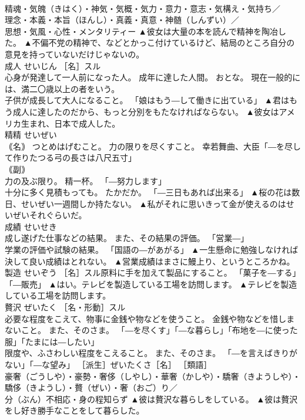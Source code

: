 \documentclass[8pt]{extreport}
\begin{document}
\begin{CJK}{UTF8}{min}
\\	精魂・気魄（きはく）・神気・気概・気力・意力・意志・気構え・気持ち／
\\	理念・本義・本旨（ほんし）・真義・真意・神髄（しんずい）／
\\	思想・気風・心性・メンタリティー	▲彼女は大量の本を読んで精神を陶冶した。 ▲不偏不党の精神で、などとかっこ付けているけど、結局のところ自分の意見を持っていないだけじゃないの。
\\	成人	せいじん	［名］スル 
\\	心身が発達して一人前になった人。 成年に達した人間。 おとな。 現在一般的には、満二〇歳以上の者をいう。 
\\	子供が成長して大人になること。 「娘はもう―して働きに出ている」	▲君はもう成人に達したのだから、もっと分別をもたなければならない。 ▲彼女はアメリカ生まれ、日本で成人した。
\\	精精	せいぜい	
\\	｟名｠ つとめはげむこと。 力の限りを尽くすこと。 幸若舞曲、大臣「―を尽して作りたつる弓の長さは八尺五寸」 
\\	｟副｠ 
\\	力の及ぶ限り。 精一杯。 「―努力します」 
\\	十分に多く見積もっても。 たかだか。 「―三日もあれば出来る」	▲桜の花は数日、せいぜい一週間しか持たない。 ▲私がそれに思いきって金が使えるのはせいぜいそれぐらいだ。
\\	成績	せいせき	
\\	成し遂げた仕事などの結果。 また、その結果の評価。 「営業―」 
\\	学業の評価や試験の結果。 「国語の―があがる」	▲一生懸命に勉強しなければ決して良い成績はとれない。 ▲営業成績はまさに鰻上り、というところかね。
\\	製造	せいぞう	［名］スル原料に手を加えて製品にすること。 「菓子を―する」「―販売」	▲はい。テレビを製造している工場を訪問します。 ▲テレビを製造している工場を訪問します。
\\	贅沢	ぜいたく	［名・形動］スル 
\\	必要な程度をこえて、物事に金銭や物などを使うこと。 金銭や物などを惜しまないこと。 また、そのさま。 「―を尽くす」「―な暮らし」「布地を―に使った服」「たまには―したい」 
\\	限度や、ふさわしい程度をこえること。 また、そのさま。 「―を言えばきりがない」「―な望み」 ［派生］ぜいたくさ［名］ ［類語］
\\	豪奢（ごうしや）・豪勢・奢侈（しやし）・華奢（かしや）・驕奢（きようしや）・驕侈（きようし）・贅（ぜい）・奢（おご）り／
\\	分（ぶん）不相応・身の程知らず	▲彼は贅沢な暮らしをしている。 ▲彼は贅沢をし好き勝手なことをして暮らした。

\end{CJK}
\end{document}
